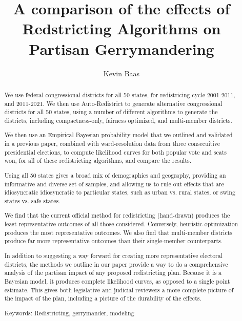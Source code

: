 \documentclass[preprint,12pt]{article}
\begin{document}
\title{A comparison of the effects of Redstricting Algorithms on Partisan Gerrymandering}

\author{Kevin Baas}

\maketitle

\begin{abstract}
We use federal congressional districts for all 50 states, for redistricing cycle 2001-2011, and 2011-2021.  We then use Auto-Redistrict to generate alternative congressional districts for all 50 states, using a number of different algorithms to generate the districts, including compactness-only, fairness optimized, and multi-member districts.

We then use an Empirical Bayesian probability model that we outlined and validated in a previous paper, combined with ward-resolution data from three consecuitive presidential elections, to compute likelihood curves for both popular vote and seats won, for all of these redistricting algorithms, and compare the results.

Using all 50 states gives a broad mix of demographics and geography, providing an informative and diverse set of samples, and allowing us to rule out effects that are idiosyncratic idiosyncratic to particular states, such as urban vs. rural states, or swing states vs. safe states.

We find that the current official method for redistricting (hand-drawn) produces the least representative outcomes of all those considered.  Conversely, heuristic optimization produces the most representative outcomes.  We also find that multi-member districts produce far more representative outcomes than their single-member counterparts.

In addition to suggesting a way forward for creating more representative electoral districts, the methods we outline in our paper provide a way to do a comprehensive analysis of the partisan impact of any proposed redistricting plan.  Because it is a Bayesian model, it produces complete likelihood curves, as opposed to a single point estimate.  This gives both legislative and judicial reviewers a more complete picture of the impact of the plan, including a picture of the durability of the effects.

Keywords: Redistricting, gerrymander, modeling

\end{abstract}
\end{document}
